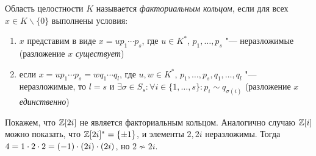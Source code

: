 Область целостности $K$ называется \textit{факториальным кольцом}, если для всех $x \in K \backslash \{0\}$ выполнены условия:
	\begin{enumerate}
		\item $x$ представим в виде $x = up_1\dotsm p_s$, где $u \in K^*$, $p_1, \dotsc, p_s$ "--- неразложимые (разложение $x$ \textit{существует})
		\item если $x = up_1\dotsm p_s = wq_1 \dotsm q_l$, где $u, w \in K^*$, $p_1, \dotsc, p_s, q_1, \dotsc, q_l$ "--- неразложимые, то $l = s$ и $\exists \sigma \in S_s: \forall i \in \{1, \dotsc, s\}: p_i \sim q_{\sigma(i)}$ (разложение $x$ \textit{единственно})
	\end{enumerate}
	
Покажем, что $\mathbb{Z}[2i]$ не является факториальным кольцом. Аналогично случаю $\mathbb{Z}[i]$ можно показать, что $\mathbb{Z}[2i]^* = \{\pm1\}$, и элементы $2, 2i$ неразложимы. Тогда $4 = 1 \cdot 2 \cdot 2 \hm= (-1)\cdot (2i) \cdot (2i)$, но $2 \not\sim 2i$.
